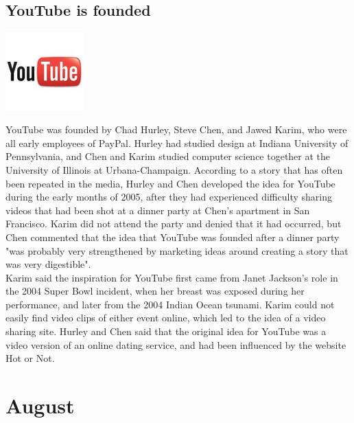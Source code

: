 \documentclass[11pt]{report}
\begin{document}
\subsection{YouTube is founded}
\begin{center}\includegraphics[width=3cm]{./img/youtube.jpg}\end{center}
YouTube was founded by Chad Hurley, Steve Chen, and Jawed Karim, who were all early employees of PayPal. Hurley had studied design at Indiana University of Pennsylvania, and Chen and Karim studied computer science together at the University of Illinois at Urbana-Champaign. According to a story that has often been repeated in the media, Hurley and Chen developed the idea for YouTube during the early months of 2005, after they had experienced difficulty sharing videos that had been shot at a dinner party at Chen's apartment in San Francisco. Karim did not attend the party and denied that it had occurred, but Chen commented that the idea that YouTube was founded after a dinner party "was probably very strengthened by marketing ideas around creating a story that was very digestible".\\

Karim said the inspiration for YouTube first came from Janet Jackson's role in the 2004 Super Bowl incident, when her breast was exposed during her performance, and later from the 2004 Indian Ocean tsunami. Karim could not easily find video clips of either event online, which led to the idea of a video sharing site. Hurley and Chen said that the original idea for YouTube was a video version of an online dating service, and had been influenced by the website Hot or Not.

\section{August}
\end{document}
